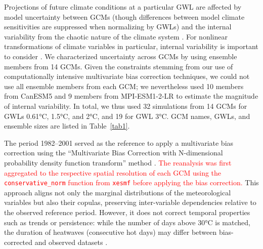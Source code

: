 \documentclass[pdflatex,sn-mathphys-num]{sn-jnl}%
\begin{document}
Projections of future climate conditions at a particular GWL are affected by model uncertainty between GCMs (though differences between model climate sensitivities are suppressed when normalizing by GWLs) and the internal variability from the chaotic nature of the climate system \cite{hawkinsPotentialNarrowUncertainty2009}. For nonlinear transformations of climate variables in particular, internal variability is important to consider \cite{schwarzwaldImportanceInternalClimate2022a}. We characterized uncertainty across GCMs by using ensemble members from 14 GCMs. Given the constraints stemming from our use of computationally intensive multivariate bias correction techniques, we could not use all ensemble members from each GCM; we nevertheless used 10 members from CanESM5 and 9 members from MPI-ESM1-2-LR to estimate the magnitude of internal variability.
In total, we thus used 32 simulations from 14 GCMs for GWLs 0.61°C, 1.5°C, and 2°C, and 19 for GWL 3°C. GCM names, GWLs, and ensemble sizes are listed in Table~\ref{tab1}.
    
The period 1982–2001 served as the reference to apply a multivariate bias correction using the ``Multivariate Bias Correction with N-dimensional probability density function transform'' method \cite{cannonMultivariateQuantileMapping2018}. \textcolor{red}{The reanalysis was first aggregated to the respective spatial resolution of each GCM using the \texttt{conservative\_norm} function from \texttt{xesmf} before applying the bias correction.} This approach aligns not only the marginal distributions of the meteorological variables but also their copulas, preserving inter-variable dependencies relative to the observed reference period. However, it does not correct temporal properties such as trends or persistence: while the number of days above 30°C is matched, the duration of heatwaves (consecutive hot days) may differ between bias-corrected and observed datasets \cite{cannonMultivariateQuantileMapping2018}.
\end{document}

